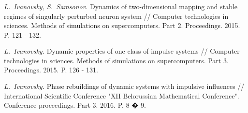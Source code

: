 \documentclass[fullscreen=true, unicode, bookmarks=false]{beamer}
\begin{document}
\begin{frame}
\frametitle{} 

\textit{L.~Ivanovsky, S.~Samsonov. } 
{Dynamics of two-dimensional mapping and stable regimes of singularly perturbed neuron system //
Computer technologies in sciences. Methods of simulations on supercomputers. Part 2. Proceedings. 2015. P. 121 - 132. }

\vspace{1cm}

\textit{L.~Ivanovsky. } 
{Dynamic properties of one class of impulse systems //
Computer technologies in sciences. Methods of simulations on supercomputers. Part 3. Proceedings. 2015. P. 126 - 131. }

\vspace{1cm}

\textit{L.~Ivanovsky. } 
{Phase rebuildings of dynamic systems with impulsive influences //
International Scientific Conference "XII Belorussian Mathematical Conference". Conference proceedings. Part 3. 2016. P. 8 � 9. }

\end{frame}
\end{document}
